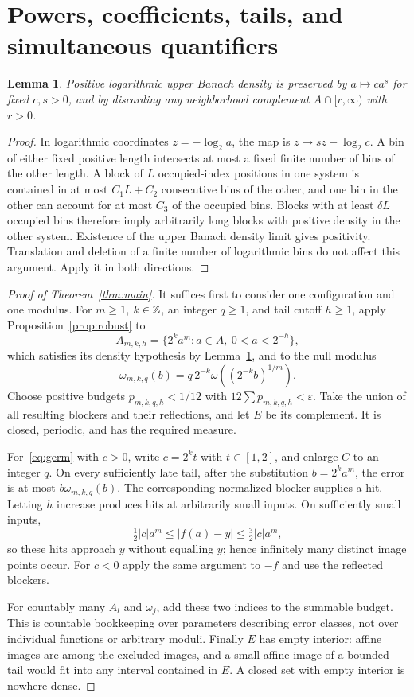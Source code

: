 \documentclass[11pt]{article}
\newtheorem{lemma}[theorem]{Lemma}
\theoremstyle{remark}\newtheorem{remark}[theorem]{Remark}
\begin{document}
\section{Powers, coefficients, tails, and simultaneous quantifiers}
\begin{lemma}\label{lem:powers}
Positive logarithmic upper Banach density is preserved by $a\mapsto c a^s$ for fixed $c,s>0$, and by discarding any neighborhood complement $A\cap[r,\infty)$ with $r>0$.
\end{lemma}
\begin{proof}
In logarithmic coordinates $z=-\log_2 a$, the map is $z\mapsto sz-\log_2 c$. A bin of either fixed positive length intersects at most a fixed finite number of bins of the other length. A block of $L$ occupied-index positions in one system is contained in at most $C_1L+C_2$ consecutive bins of the other, and one bin in the other can account for at most $C_3$ of the occupied bins. Blocks with at least $\delta L$ occupied bins therefore imply arbitrarily long blocks with positive density in the other system. Existence of the upper Banach density limit gives positivity. Translation and deletion of a finite number of logarithmic bins do not affect this argument. Apply it in both directions.
\end{proof}

\begin{proof}[Proof of Theorem~\ref{thm:main}]
It suffices first to consider one configuration and one modulus. For $m\ge1$, $k\in\mathbb Z$, an integer $q\ge1$, and tail cutoff $h\ge1$, apply Proposition~\ref{prop:robust} to
\[
 A_{m,k,h}=\{2^k a^m:a\in A,\ 0<a<2^{-h}\},
\]
which satisfies its density hypothesis by Lemma~\ref{lem:powers}, and to the null modulus
\[
 \omega_{m,k,q}(b)=q\,2^{-k}\omega((2^{-k}b)^{1/m}).
\]
Choose positive budgets $p_{m,k,q,h}<1/12$ with $12\sum p_{m,k,q,h}<\varepsilon$. Take the union of all resulting blockers and their reflections, and let $E$ be its complement. It is closed, periodic, and has the required measure.

For~\eqref{eq:germ} with $c>0$, write $c=2^kt$ with $t\in[1,2]$, and enlarge $C$ to an integer $q$. On every sufficiently late tail, after the substitution $b=2^ka^m$, the error is at most $b\omega_{m,k,q}(b)$. The corresponding normalized blocker supplies a hit. Letting $h$ increase produces hits at arbitrarily small inputs. On sufficiently small inputs,
\[
 \tfrac12|c|a^m\le |f(a)-y|\le\tfrac32|c|a^m,
\]
so these hits approach $y$ without equalling $y$; hence infinitely many distinct image points occur. For $c<0$ apply the same argument to $-f$ and use the reflected blockers.

For countably many $A_l$ and $\omega_j$, add these two indices to the summable budget. This is countable bookkeeping over parameters describing error classes, not over individual functions or arbitrary moduli. Finally $E$ has empty interior: affine images are among the excluded images, and a small affine image of a bounded tail would fit into any interval contained in $E$. A closed set with empty interior is nowhere dense.
\end{proof}
\end{document}
